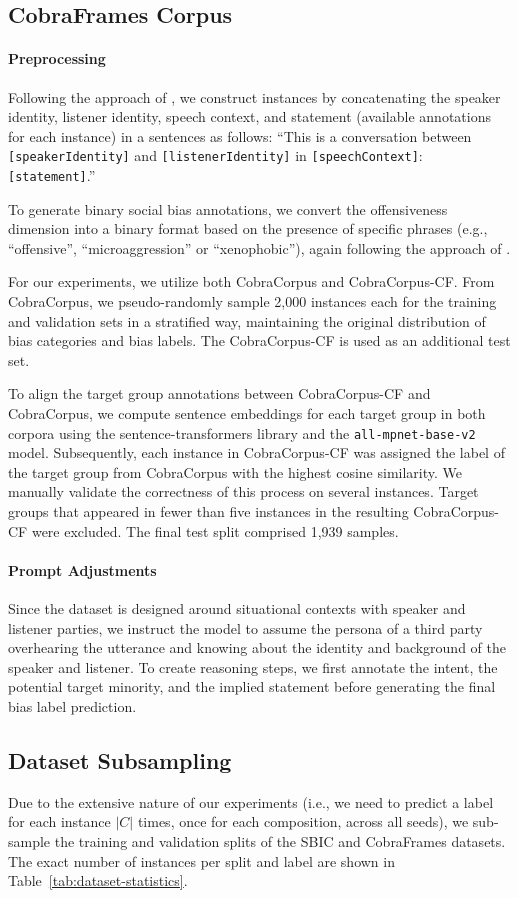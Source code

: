 \subsection{CobraFrames Corpus}
\paragraph{Preprocessing}
Following the approach of \citet{zhou2023a}, we construct instances by concatenating the speaker identity, listener identity, speech context, and statement (available annotations for each instance) in a sentences as follows: ``This is a conversation between \texttt{[speakerIdentity]} and \texttt{[listenerIdentity]} in \texttt{[speechContext]}: \texttt{[statement]}.''

To generate binary social bias annotations, we convert the offensiveness dimension into a binary format based on the presence of specific phrases (e.g., ``offensive'', ``microaggression'' or ``xenophobic''), again following the approach of \citet{zhou2023a}.

For our experiments, we utilize both CobraCorpus and CobraCorpus-CF. From CobraCorpus, we pseudo-randomly sample 2,000 instances each for the training and validation sets in a stratified way, maintaining the original distribution of bias categories and bias labels. The CobraCorpus-CF is used as an additional test set.

To align the target group annotations between CobraCorpus-CF and CobraCorpus, we compute sentence embeddings for each target group in both corpora using the sentence-transformers library \cite{reimers2019} and the \texttt{all-mpnet-base-v2} model. Subsequently, each instance in CobraCorpus-CF was assigned the label of the target group from CobraCorpus with the highest cosine similarity. We manually validate the correctness of this process on several instances. Target groups that appeared in fewer than five instances in the resulting CobraCorpus-CF were excluded. The final test split comprised 1,939 samples.

\paragraph{Prompt Adjustments}
Since the dataset is designed around situational contexts with speaker and listener parties, we instruct the model to assume the persona of a third party overhearing the utterance and knowing about the identity and background of the speaker and listener. To create reasoning steps, we first annotate the intent, the potential target minority, and the implied statement before generating the final bias label prediction.




\subsection{Dataset Subsampling}
Due to the extensive nature of our experiments (i.e., we need to predict a label for each instance $|C|$ times, once for each composition, across all seeds), we sub-sample the training and validation splits of the SBIC and CobraFrames datasets. The exact number of instances per split and label are shown in Table~\ref{tab:dataset-statistics}.
